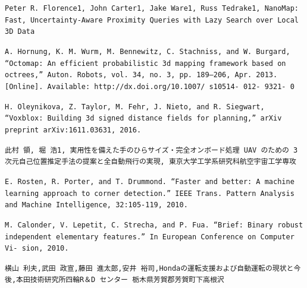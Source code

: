 \documentclass[a4j,10pt]{jsarticle}
\begin{document}
\begin{thebibliography}{99}
\texttt{Peter R. Florence1, John Carter1, Jake Ware1, Russ Tedrake1, NanoMap: Fast, Uncertainty-Aware Proximity Queries with Lazy Search over Local 3D Data}

\texttt{A. Hornung, K. M. Wurm, M. Bennewitz, C. Stachniss, and W. Burgard, “Octomap: An efficient probabilistic 3d mapping framework based on octrees,” Auton. Robots, vol. 34, no. 3, pp. 189–206, Apr. 2013. [Online]. Available: http://dx.doi.org/10.1007/ s10514- 012- 9321- 0}

\texttt{H. Oleynikova, Z. Taylor, M. Fehr, J. Nieto, and R. Siegwart, “Voxblox: Building 3d signed distance fields for planning,” arXiv preprint arXiv:1611.03631, 2016.}

\texttt{此村 領, 堀 浩1, 実用性を備えた手のひらサイズ・完全オンボード処理 UAV のための 3 次元自己位置推定手法の提案と全自動飛行の実現, 東京大学工学系研究科航空宇宙工学専攻}

\texttt{E. Rosten, R. Porter, and T. Drummond. “Faster and better: A machine learning approach to corner detection.” IEEE Trans. Pattern Analysis and Machine Intelligence, 32:105-119, 2010.}

\texttt{M. Calonder, V. Lepetit, C. Strecha, and P. Fua. “Brief: Binary robust independent elementary features.” In European Conference on Computer Vi- sion, 2010.}

\texttt{横山 利夫,武田 政宣,藤田 進太郎,安井 裕司,Hondaの運転支援および自動運転の現状と今後,本田技術研究所四輪R＆D センター 栃木県芳賀郡芳賀町下高根沢}

\end{thebibliography}
\end{document}
